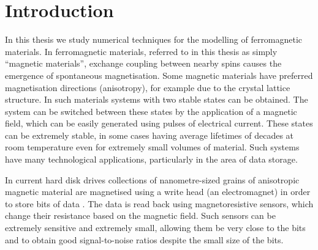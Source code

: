 \chapter{Introduction}
\label{sec:introduction}


In this thesis we study numerical techniques for the modelling of ferromagnetic materials.
In ferromagnetic materials, referred to in this thesis as simply ``magnetic materials'', exchange coupling between nearby spins causes the emergence of spontaneous magnetisation.
Some magnetic materials have preferred magnetisation directions (anisotropy), for example due to the crystal lattice structure.
In such materials systems with two stable states can be obtained.
The system can be switched between these states by the application of a magnetic field, which can be easily generated using pulses of electrical current.
These states can be extremely stable, in some cases having average lifetimes of decades at room temperature even for extremely small volumes of material.
Such systems have many technological applications, particularly in the area of data storage.

In current hard disk drives collections of nanometre-sized grains of anisotropic magnetic material are magnetised using a write head (an electromagnet) in order to store bits of data \cite[Sec. 14.6]{Kronmuller1997}.
The data is read back using magnetoresistive sensors, which change their resistance based on the magnetic field.
Such sensors can be extremely sensitive and extremely small, allowing them be very close to the bits and to obtain good signal-to-noise ratios despite the small size of the bits.

